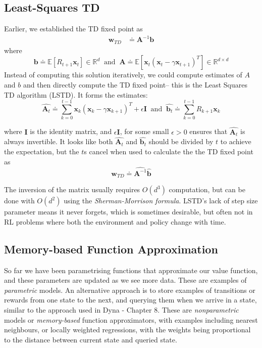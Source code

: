 \subsection{Least-Squares TD}
Earlier, we established the TD fixed point as
\begin{align}
\textbf{w}_{TD} &\doteq \textbf{A}^{-1}\textbf{b}
\end{align}
where
\begin{equation}
\textbf{b} \doteq \mathbb{E}[R_{t+1} \textbf{x}_t] \in \mathbb{R}^d \; \; \text{and} \; \; \textbf{A} \doteq \mathbb{E}\left[\textbf{x}_t(\textbf{x}_t - \gamma \textbf{x}_{t+1})^T\right] \in \mathbb{R}^{d \times d}
\end{equation}
Instead of computing this solution iteratively, we could compute estimates of $A$ and $b$ and then directly compute the TD fixed point– this is the Least Squares TD algorithm (LSTD). It forms the estimates:
\begin{equation}
\hat{\textbf{A}_t} \doteq \sum_{k=0}^{t-1} \textbf{x}_k(\textbf{x}_k - \gamma \textbf{x}_{k+1})^T + \epsilon \textbf{I} \; \; \text{and} \; \; \hat{\textbf{b}_t} \doteq \sum_{k=0}^{t-1} R_{k+1}\textbf{x}_k
\end{equation}

where $\textbf{I}$ is the identity matrix, and $\epsilon \textbf{I}$, for some small $\epsilon > 0$ ensures that $\hat{\textbf{A}_t}$ is always invertible. It looks like both $\hat{\textbf{A}_t}$ and $\hat{\textbf{b}_t}$ should be divided by $t$ to achieve the expectation, but the $t$s cancel when used to calculate the the TD fixed point as 
\begin{equation}
\textbf{w}_{TD} \doteq \hat{\textbf{A}^{-1}}\hat{\textbf{b}}
\end{equation}

The inversion of the matrix usually requires $O(d^3)$ computation, but can be done with $O(d^2)$ using the \textit{Sherman-Morrison formula}. LSTD's lack of step size parameter means it never forgets, which is sometimes desirable, but often not in RL problems where both the environment and policy change with time.

\subsection{Memory-based Function Approximation}
So far we have been parametrising functions that approximate our value function, and these parameters are updated as we see more data. These are examples of \textit{parametric} models. An alternative approach is to store examples of transitions or rewards from one state to the next, and querying them when we arrive in a state, similar to the approach used in Dyna - Chapter 8. These are \textit{nonparametric} models or \textit{memory-based} function approximators, with examples including nearest neighbours, or locally weighted regressions, with the weights being proportional to the distance between current state and queried state.

